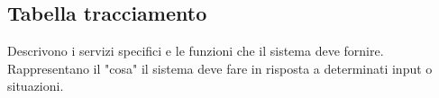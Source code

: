 ﻿\documentclass[a4paper,11pt]{article}
\begin{document}
\subsection{Tabella tracciamento}
Descrivono i servizi specifici e le funzioni che il sistema deve fornire. Rappresentano il "cosa" il sistema deve fare in risposta a determinati input o situazioni.
\vspace{0.5cm}


\renewcommand{\arraystretch}{1.2}
\setlength{\tabcolsep}{4pt}




\newcommand{\autoRFa}{%
  \stepcounter{rfaCounter}%
  RF-%
  \ifnum\value{rfaCounter}<100 0\fi %
  \ifnum\value{rfaCounter}<10 0\fi  %
  \arabic{rfaCounter}%
}

\setcounter{rfaCounter}{0}
\end{document}
